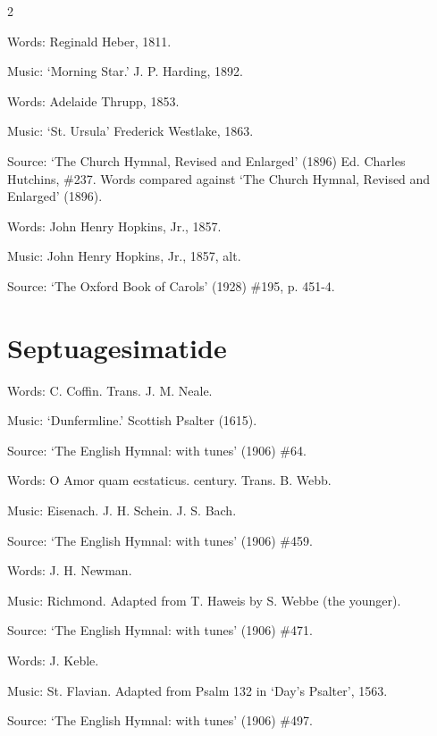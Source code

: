 \begin{multicols}{2}
\par\noindent
Words: Reginald Heber, 1811.
\par\noindent
Music: `Morning Star.' J. P. Harding, 1892.


\par\noindent
Words: Adelaide Thrupp, 1853.
\par\noindent
Music: `St. Ursula' Frederick Westlake, 1863. 
\par\noindent
Source: `The Church Hymnal, Revised and Enlarged' (1896) Ed. Charles Hutchins, \#237. Words compared against `The Church Hymnal, Revised and Enlarged' (1896).


\par\noindent
Words: John Henry Hopkins, Jr., 1857.
\par\noindent
Music: John Henry Hopkins, Jr., 1857, alt.
\par\noindent
Source: `The Oxford Book of Carols' (1928) \#195, p. 451-4.


\section*{Septuagesimatide}
\par\noindent
Words: C. Coffin. Trans. J. M. Neale.
\par\noindent
Music: `Dunfermline.' Scottish Psalter (1615).
\par\noindent
Source: `The English Hymnal: with tunes' (1906) \#64.


\par\noindent
Words: O Amor quam ecstaticus.  century. Trans. B. Webb.
\par\noindent
Music: Eisenach. J. H. Schein. J. S. Bach.
\par\noindent
Source: `The English Hymnal: with tunes' (1906) \#459.


\par\noindent
Words: J. H. Newman.
\par\noindent
Music: Richmond. Adapted from T. Haweis by S. Webbe (the younger).
\par\noindent
Source: `The English Hymnal: with tunes' (1906) \#471.


\par\noindent
Words: J. Keble.
\par\noindent
Music: St. Flavian. Adapted from Psalm 132 in `Day's Psalter', 1563.
\par\noindent
Source: `The English Hymnal: with tunes' (1906) \#497.



\end{multicols}
